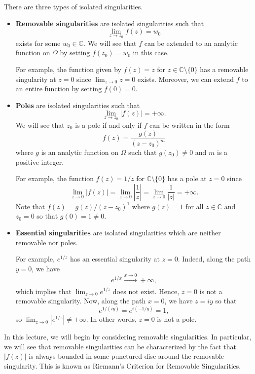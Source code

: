 \documentclass[10pt]{article}
\newcommand{\C}{\mathbb{C}}
\theoremstyle{newstyle}
\begin{document}
There are three types of isolated singularities. 
\begin{itemize}
    \item {\bf Removable singularities} are isolated singularities such that 
    \[ \lim_{z\to z_0} f(z) = w_0 \]
    exists for some $w_0 \in \C$. We will see that $f$ can be extended to an analytic function on 
    $\Omega$ by setting $f(z_0) = w_0$ in this case. 
    
    For example, the function given by $f(z) = z$ for $z \in \C \setminus \{0\}$ has a removable
    singularity at $z = 0$ since $\lim_{z\to 0} z = 0$ exists. Moreover, we can extend $f$ to an entire 
    function by setting $f(0) = 0$. 
    
    \item {\bf Poles} are isolated singularities such that 
    \[ \lim_{z\to z_0} |f(z)| = +\infty. \]
    We will see that $z_0$ is a pole if and only if $f$ can be written in the form 
    \[ f(z) = \frac{g(z)}{(z-z_0)^m} \]
    where $g$ is an analytic function on $\Omega$ such that $g(z_0) \neq 0$ and $m$ is a positive integer. 
    
    For example, the function $f(z) = 1/z$ for $\C \setminus \{0\}$ has a pole at $z = 0$ since 
    \[ \lim_{z\to0} |f(z)| = \lim_{z\to0} \left|\frac1z\right| = \lim_{z\to0} \frac1{|z|} = +\infty. \]
    Note that $f(z) = g(z)/(z-z_0)^1$ where $g(z) = 1$ for all $z \in \C$ and $z_0 = 0$ so that 
    $g(0) = 1 \neq 0$. 
    
    \item {\bf Essential singularities} are isolated singularities which are neither removable nor 
    poles. 
    
    For example, $e^{1/z}$ has an essential singularity at $z = 0$. Indeed, along the path $y = 0$, 
    we have 
    \[ e^{1/x} \xrightarrow[]{x\to0} +\infty, \]
    which implies that $\lim_{z\to0} e^{1/z}$ does not exist. Hence, $z = 0$ is not a removable 
    singularity. Now, along the path $x = 0$, we have $z = iy$ so that 
    \[ e^{1/(iy)} = e^{i(-1/y)} = 1, \]
    so $\lim_{z\to0} |e^{1/z}| \neq +\infty$. In other words, $z = 0$ is not a pole. 
\end{itemize}

In this lecture, we will begin by considering removable singularities. In particular, we will 
see that removable singularities can be characterized by the fact that $|f(z)|$ is always 
bounded in some punctured disc around the removable singularity. This is known as 
Riemann's Criterion for Removable Singularities. 
\end{document}
